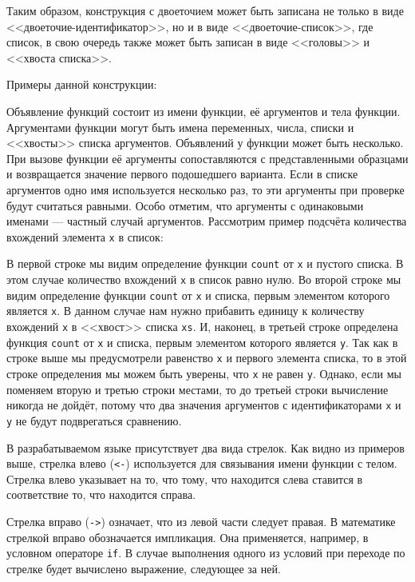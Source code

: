         Таким образом, конструкция с двоеточием может быть записана не только в виде <<двоеточие-идентификатор>>, но и в виде <<двоеточие-список>>, где список, в свою очередь также может быть записан в виде <<головы>> и <<хвоста списка>>.

        Примеры данной конструкции:

        

        Объявление функций состоит из имени функции, её аргументов и тела функции.
        Аргументами функции могут быть имена переменных, числа, списки и <<хвосты>> списка аргументов.
        Объявлений у функции может быть несколько.
        При вызове функции её аргументы сопоставляются с представленными образцами и возвращается значение первого подошедшего варианта.
        Если в списке аргументов одно имя используется несколько раз, то эти аргументы при проверке будут считаться равными.
        Особо отметим, что аргументы с одинаковыми именами --- частный случай аргументов.
        Рассмотрим пример подсчёта количества вхождений элемента \verb,x, в список:

        

        В первой строке мы видим определение функции \verb,count, от \verb,x, и пустого списка.
        В этом случае количество вхождений \verb,x, в список равно нулю.
        Во второй строке мы видим определение функции \verb,count, от \verb,x, и списка, первым элементом которого является \verb,x,.
        В данном случае нам нужно прибавить единицу к количеству вхождений \verb,x, в <<хвост>> списка \verb,xs,.
        И, наконец, в третьей строке определена функция \verb,count, от \verb,x, и списка, первым элементом которого является \verb,y,.
        Так как в строке выше мы предусмотрели равенство \verb,x, и первого элемента списка, то в этой строке определения мы можем быть уверены, что \verb,x, не равен \verb,y,.
        Однако, если мы поменяем вторую и третью строки местами, то до третьей строки вычисление никогда не дойдёт, потому что два значения аргументов с идентификаторами \verb,x, и \verb,y, не будут подврегаться сравнению.

        В разрабатываемом языке присутствует два вида стрелок.
        Как видно из примеров выше, стрелка влево (\verb!<-!) используется для связывания имени функции с телом.
        Стрелка влево указывает на то, что тому, что находится слева ставится в соответствие то, что находится справа.

        Стрелка вправо (\verb!->!) означает, что из левой части следует правая.
        В математике стрелкой вправо обозначается импликация.
        Она применяется, например, в условном операторе \verb$if$.
        В случае выполнения одного из условий при переходе по стрелке будет вычислено выражение, следующее за ней.
        
